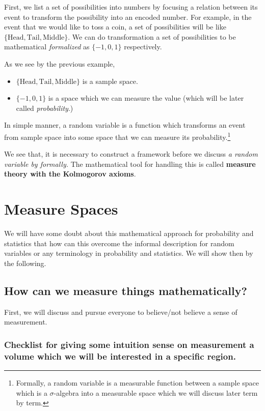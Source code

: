 \documentclass[12pt, a4paper]{report}
\begin{document}
    First, we list a set of possibilities into numbers by focusing a relation between its event to transform the possibility into an encoded number. For example, in the event that we would like to toss a coin, a set of possibilities will be like $\{\text{Head}, \text{Tail}, \text{Middle}\}$. We can do transformation a set of possibilities to be mathematical \emph{formalized} as $\{-1, 0, 1\}$ respectively.

    As we see by the previous example,
    \begin{itemize}
        \item $\{\text{Head}, \text{Tail}, \text{Middle}\}$ is a sample space.
        \item $\{-1, 0, 1\}$ is a space which we can measure the value (which will be later called \emph{probability}.)
    \end{itemize} 

    In simple manner, a random variable is a function which transforms an event from sample space into some space that we can measure its probability.\footnote{Formally, a random variable is a measurable function between a sample space which is a $\sigma$-algebra into a measurable space which we will discuss later term by term.}

    We see that, it is necessary to construct a framework before we discuss \emph{a random variable by formally.} The mathematical tool for handling this is called \textbf{measure theory with the Kolmogorov axioms}.

    \section{Measure Spaces}
    We will have some doubt about this mathematical approach for probability and statistics that how can this overcome the informal description for random variables or any terminology in probability and statistics. We will show then by the following.
    \subsection{How can we measure things mathematically?}
    First, we will discuss and pursue everyone to believe/not believe a sense of measurement.

    \subsubsection{Checklist for giving some intuition sense on measurement a volume which we will be interested in a specific region.}
\end{document}
